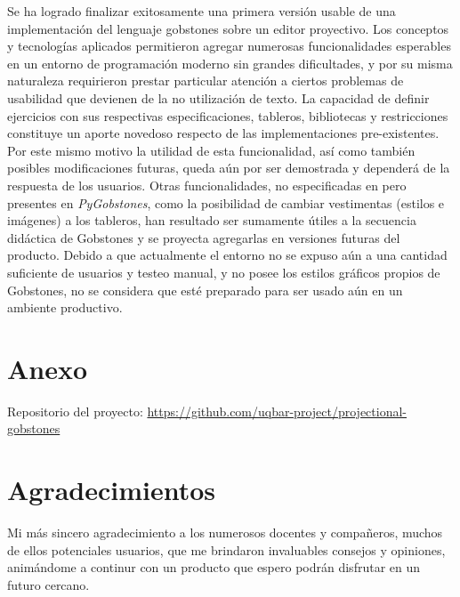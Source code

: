 Se ha logrado finalizar exitosamente una primera versión usable de una implementación del lenguaje gobstones sobre un editor proyectivo. Los conceptos y tecnologías aplicados permitieron agregar numerosas funcionalidades esperables en un entorno de programación moderno sin grandes dificultades, y por su misma naturaleza requirieron prestar particular atención a ciertos problemas de usabilidad que devienen de la no utilización de texto.
La capacidad de definir ejercicios con sus respectivas especificaciones, tableros, bibliotecas y restricciones constituye un aporte novedoso respecto de las implementaciones pre-existentes. Por este mismo motivo la utilidad de esta funcionalidad, así como también posibles modificaciones futuras, queda aún por ser demostrada y dependerá de la respuesta de los usuarios. Otras funcionalidades, no especificadas en  pero presentes en \textit{PyGobstones}, como la posibilidad de cambiar vestimentas (estilos e imágenes) a los tableros, han resultado ser sumamente útiles a la secuencia didáctica de Gobstones y se proyecta agregarlas en versiones futuras del producto.
Debido a que actualmente el entorno no se expuso aún a una cantidad suficiente de usuarios y testeo manual, y no posee los estilos gráficos propios de Gobstones, no se considera que esté preparado para ser usado aún en un ambiente productivo. 

\section{Anexo}\label{anexo}

Repositorio del proyecto: \url{https://github.com/uqbar-project/projectional-gobstones}

\section{Agradecimientos}

Mi más sincero agradecimiento a los numerosos docentes y compañeros, muchos de ellos potenciales usuarios, que me brindaron invaluables consejos y opiniones, animándome a continur con un producto que espero podrán disfrutar en un futuro cercano.
